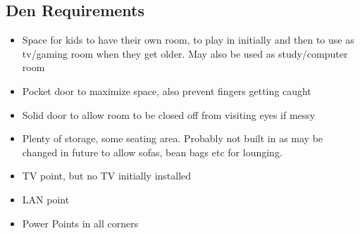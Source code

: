\subsection{Den Requirements}
\begin{itemize}
\item Space for kids to have their own room, to play in initially and then to use as tv/gaming room when they get older. May also be used as study/computer room

\item Pocket door to maximize space, also prevent fingers getting caught
\item Solid door to allow room to be closed off from visiting eyes if messy
\item Plenty of storage, some seating area. Probably not built in as may be changed in future to allow sofas, bean bags etc for lounging.
\item TV point, but no TV initially installed
\item LAN point
\item Power Points in all corners

\end{itemize}
